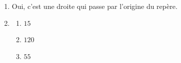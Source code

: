 %
%
    \begin{enumerate}
        \item Oui, c'est une droite qui passe par l'origine du repère.
        \item
              \begin{enumerate}
                  \item[\circled{A}] \(15\)
                  \item[\circled{B}] \(120\)
                  \item[\circled{C}] \(55\)
              \end{enumerate}
    \end{enumerate}
